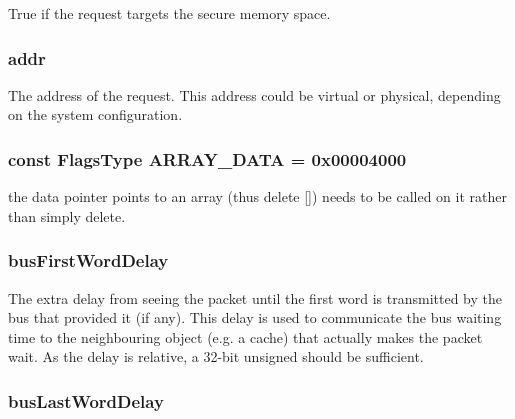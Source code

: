 True if the request targets the secure memory space. \hypertarget{classPacket_a0bb77b4ba61e408313e1118250f9278c}{
\subsubsection[{addr}]{ {\bf addr}}}
\label{classPacket_a0bb77b4ba61e408313e1118250f9278c}
The address of the request. This address could be virtual or physical, depending on the system configuration. \hypertarget{classPacket_a861863488f543d1fd5aaf422469ba27a}{
\subsubsection[{ARRAY\_\-DATA}]{\setlength{\rightskip}{0pt plus 5cm}const {\bf FlagsType} {\bf ARRAY\_\-DATA} = 0x00004000}}
\label{classPacket_a861863488f543d1fd5aaf422469ba27a}
the data pointer points to an array (thus delete \mbox{[}\mbox{]}) needs to be called on it rather than simply delete. \hypertarget{classPacket_af8986a05caa6c5b96b0b01bb6cf47772}{
\subsubsection[{busFirstWordDelay}]{ {\bf busFirstWordDelay}}}
\label{classPacket_af8986a05caa6c5b96b0b01bb6cf47772}
The extra delay from seeing the packet until the first word is transmitted by the bus that provided it (if any). This delay is used to communicate the bus waiting time to the neighbouring object (e.g. a cache) that actually makes the packet wait. As the delay is relative, a 32-\/bit unsigned should be sufficient. \hypertarget{classPacket_a7bf8ae0a056329f751eda8b39ca4c268}{
\subsubsection[{busLastWordDelay}]{ {\bf busLastWordDelay}}}
